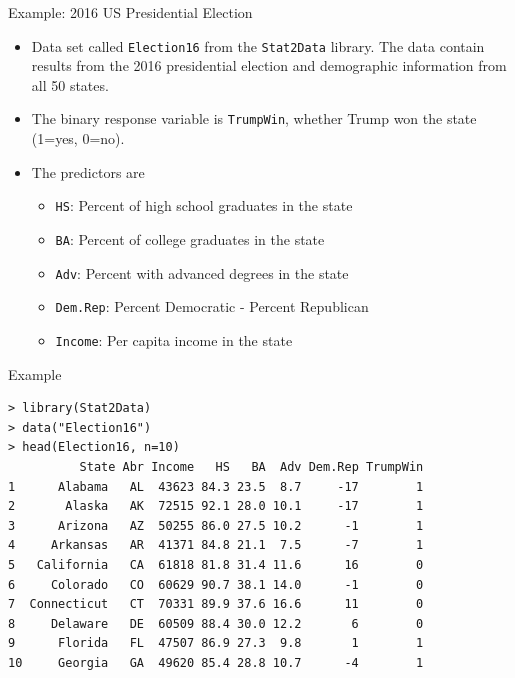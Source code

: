 \documentclass[10pt]{beamer}\usepackage[]{graphicx}\usepackage[]{color}
\begin{document}
\begin{frame}{Example: 2016 US Presidential Election}
\begin{itemize}
\item Data set called \texttt{Election16} from the \texttt{Stat2Data} library.  The data contain results from the 2016 presidential election and demographic information from all 50 states.
\vspace{10pt}
\item The binary response variable is \texttt{TrumpWin}, whether Trump won the state (1=yes, 0=no).
\vspace{10pt}
\item The predictors are
\begin{itemize}
\item \texttt{HS}: Percent of high school graduates in the state
\item \texttt{BA}: Percent of college graduates in the state
\item \texttt{Adv}: Percent with advanced degrees in the state
\item \texttt{Dem.Rep}:  Percent Democratic - Percent Republican
\item \texttt{Income}: Per capita income in the state
\end{itemize}
\end{itemize}
\end{frame}

\begin{frame}[fragile]{Example}
\small
\begin{verbatim}
> library(Stat2Data)
> data("Election16")
> head(Election16, n=10)
          State Abr Income   HS   BA  Adv Dem.Rep TrumpWin
1      Alabama   AL  43623 84.3 23.5  8.7     -17        1
2       Alaska   AK  72515 92.1 28.0 10.1     -17        1
3      Arizona   AZ  50255 86.0 27.5 10.2      -1        1
4     Arkansas   AR  41371 84.8 21.1  7.5      -7        1
5   California   CA  61818 81.8 31.4 11.6      16        0
6     Colorado   CO  60629 90.7 38.1 14.0      -1        0
7  Connecticut   CT  70331 89.9 37.6 16.6      11        0
8     Delaware   DE  60509 88.4 30.0 12.2       6        0
9      Florida   FL  47507 86.9 27.3  9.8       1        1
10     Georgia   GA  49620 85.4 28.8 10.7      -4        1
\end{verbatim}
\end{frame}
\end{document}
